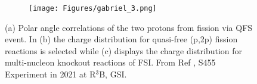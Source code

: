 \begin{description}
\begin{figure}[htpb]
\begin{subfigure}[b]{0.3\textwidth}
    \end{subfigure}
    \begin{subfigure}[b]{0.3\textwidth}
    \texttt{[image: Figures/gabriel\_3.png]}
    \end{subfigure}
    \caption{(a) Polar angle correlations of the two protons from fission via QFS event. In (b)  the charge distribution for quasi-free (p,2p) fission reactions is selected while (c) displays the charge distribution for multi-nucleon knockout reactions of FSI. From Ref \cite{garcia2023study}, S455 Experiment in 2021 at R$^3$B, GSI.}
    \label{fig:qfs_fission}
\end{figure}

\end{description}
